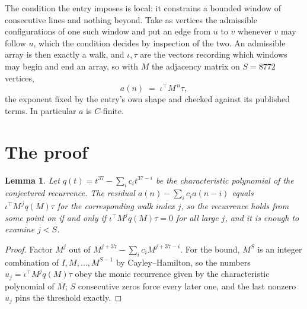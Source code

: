 \documentclass[11pt,a4paper]{article}
\theoremstyle{plain}
\newtheorem{lemma}[theorem]{Lemma}
\theoremstyle{definition}
\begin{document}
The condition the entry imposes is local: it constrains a bounded window of consecutive lines and nothing beyond. Take as vertices the admissible configurations of one such window and put an edge from $u$ to $v$ whenever $v$ may follow $u$, which the condition decides by inspection of the two.
An admissible array is then exactly a walk, and $\iota,\tau$ are the vectors recording which windows may begin and end an array, so with $M$ the adjacency matrix on $S=8772$ vertices,
\[
a(n)\;=\;\iota^{\!\top}M^{\,n}\tau ,
\]
the exponent fixed by the entry's own shape and checked against its published terms. In
particular $a$ is $C$-finite.

\section{The proof}

\begin{lemma}\label{lem:crit}
Let $q(t)=t^{37}-\sum_i c_it^{37-i}$ be the characteristic polynomial of the
conjectured recurrence. The residual $a(n)-\sum_ic_ia(n-i)$ equals
$\iota^{\!\top}M^{\,j}q(M)\tau$ for the corresponding walk index $j$, so the recurrence
holds from some point on if and only if $\iota^{\!\top}M^{j}q(M)\tau=0$ for all large $j$,
and it is enough to examine $j<S$.
\end{lemma}

\begin{proof}
Factor $M^{j}$ out of $M^{j+37}-\sum_ic_iM^{j+37-i}$. For the bound, $M^{S}$
is an integer combination of $I,M,\dots,M^{S-1}$ by Cayley--Hamilton, so the numbers
$u_j=\iota^{\!\top}M^{j}q(M)\tau$ obey the monic recurrence given by the characteristic
polynomial of $M$; $S$ consecutive zeros force every later one, and the last nonzero $u_j$
pins the threshold exactly.
\end{proof}
\end{document}
